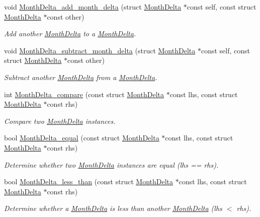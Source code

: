 \begin{DoxyCompactItemize}
void \hyperlink{month-delta_8h_a83addeaf706975d666783697489c70ce}{\-Month\-Delta\-\_\-add\-\_\-month\-\_\-delta} (struct \hyperlink{structMonthDelta}{\-Month\-Delta} $\ast$const self, const struct \hyperlink{structMonthDelta}{\-Month\-Delta} $\ast$const other)
\begin{DoxyCompactList}\small\item\em \-Add another \hyperlink{structMonthDelta}{\-Month\-Delta} to a \hyperlink{structMonthDelta}{\-Month\-Delta}. \end{DoxyCompactList}\item 
void \hyperlink{month-delta_8h_a3766040b320189e4548ab4a648877319}{\-Month\-Delta\-\_\-subtract\-\_\-month\-\_\-delta} (struct \hyperlink{structMonthDelta}{\-Month\-Delta} $\ast$const self, const struct \hyperlink{structMonthDelta}{\-Month\-Delta} $\ast$const other)
\begin{DoxyCompactList}\small\item\em \-Subtract another \hyperlink{structMonthDelta}{\-Month\-Delta} from a \hyperlink{structMonthDelta}{\-Month\-Delta}. \end{DoxyCompactList}\item 
int \hyperlink{month-delta_8h_a1428161f8576c24beb2208127abd890e}{\-Month\-Delta\-\_\-compare} (const struct \hyperlink{structMonthDelta}{\-Month\-Delta} $\ast$const lhs, const struct \hyperlink{structMonthDelta}{\-Month\-Delta} $\ast$const rhs)
\begin{DoxyCompactList}\small\item\em \-Compare two \hyperlink{structMonthDelta}{\-Month\-Delta} instances. \end{DoxyCompactList}\item 
bool \hyperlink{month-delta_8h_aa22a1b2c869af023e7c40dea79043369}{\-Month\-Delta\-\_\-equal} (const struct \hyperlink{structMonthDelta}{\-Month\-Delta} $\ast$const lhs, const struct \hyperlink{structMonthDelta}{\-Month\-Delta} $\ast$const rhs)
\begin{DoxyCompactList}\small\item\em \-Determine whether two \hyperlink{structMonthDelta}{\-Month\-Delta} instances are equal (lhs == rhs). \end{DoxyCompactList}\item 
bool \hyperlink{month-delta_8h_afa8b7517ec32257cb7f196b2eaad97ee}{\-Month\-Delta\-\_\-less\-\_\-than} (const struct \hyperlink{structMonthDelta}{\-Month\-Delta} $\ast$const lhs, const struct \hyperlink{structMonthDelta}{\-Month\-Delta} $\ast$const rhs)
\begin{DoxyCompactList}\small\item\em \-Determine whether a \hyperlink{structMonthDelta}{\-Month\-Delta} is less than another \hyperlink{structMonthDelta}{\-Month\-Delta} (lhs $<$ rhs). \end{DoxyCompactList}\item 

\end{DoxyCompactItemize}
